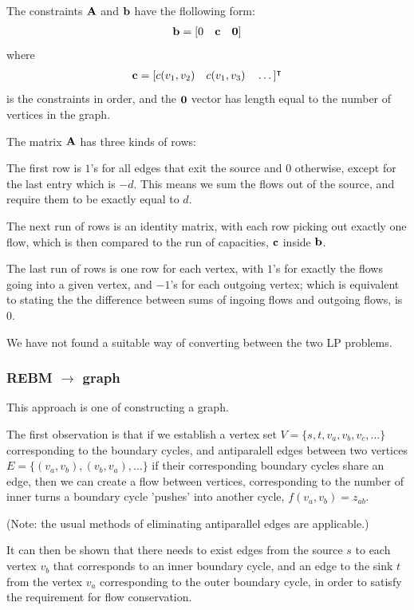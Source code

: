 The constraints $\bm{\mathrm{A}}$ and $\bm{\mathrm{b}}$ have the flollowing form:
\begin{align*}
  \bm{\mathrm{b}} = [0\quad \bm{\mathrm{c}}\quad \bm{\mathrm{0}}]
\end{align*}
where
\begin{align*}
  \bm{\mathrm{c}} = [c(v_1, v_2)\quad c(v_1,v_3)\quad \dots]^\intercal
\end{align*}
is the constraints in order, and the $\bm{\mathrm{0}}$ vector has length
equal to the number of vertices in the graph.

The matrix $\bm{\mathrm{A}}$ has three kinds of rows:

The first row is $1$'s for all edges that exit the source and $0$ otherwise,
except for the last entry which is $-d$. This means we sum the flows out of the source,
and require them to be exactly equal to $d$.

The next run of rows is an identity matrix, with each row picking out exactly 
one flow, which is then compared to the run of capacities, $\bm{\mathrm{c}}$ inside $\bm{\mathrm{b}}$.

The last run of rows is one row for each vertex, with $1$'s for exactly the flows
going into a given vertex, and $-1$'s for each outgoing vertex; which is equivalent
to stating the the difference between sums of ingoing flows and outgoing flows, is $0$.

We have not found a suitable way of converting between the two LP problems.

\subsubsection{REBM $\to$ graph}

This approach is one of constructing a graph.

The first observation is that if we establish a vertex set $V = \{s, t, v_a, v_b, v_c,
\dots\}$ corresponding to the boundary cycles, and antiparalell edges between
two vertices $E = \{ (v_a, v_b), (v_b, v_a), \dots \}$ if their corresponding
boundary cycles share an edge, then we can create a flow between vertices,
corresponding to the number of inner turns a boundary cycle 'pushes' into another cycle,
$f(v_a, v_b) = z_{ab}$.

(Note: the usual methods of eliminating antiparallel edges are applicable.)

It can then be shown that there needs to exist edges from the source $s$ to each
vertex $v_b$ that corresponds to an inner boundary cycle, and an edge to the
sink $t$ from the vertex $v_a$ corresponding to the outer boundary cycle, in
order to satisfy the requirement for flow conservation.

